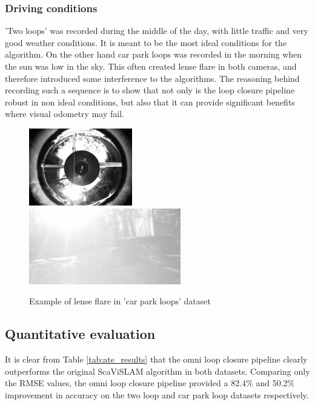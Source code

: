 \subsubsection{Driving conditions}

'Two loops' was recorded during the middle of the day, with little traffic and very good weather conditions.  It is meant to be the most ideal conditions for the algorithm.  On the other hand car park loops was recorded in the morning when the sun was low in the sky.  This often created lense flare in both cameras, and therefore introduced some interference to the algorithms.  The reasoning behind recording such a sequence is to show that not only is the loop closure pipeline robust in non ideal conditions, but also that it can provide significant benefits where visual odometry may fail.

\begin{figure}[h]
  \centering
    \includegraphics[width=0.40\textwidth]{chapters/images/omni_lense_flare}
    \includegraphics[width=0.59\textwidth]{chapters/images/stereo_lense_flare_bad}
  \caption{Example of lense flare in 'car park loops' dataset}
\end{figure}

\subsection{Quantitative evaluation}

It is clear from Table \ref{tab:ate_results} that the omni loop closure pipeline clearly outperforms the original ScaViSLAM algorithm in both datasets.  Comparing only the RMSE values, the omni loop closure pipeline provided a 82.4\% and 50.2\% improvement in accuracy on the two loop and car park loop datasets respectively. 

